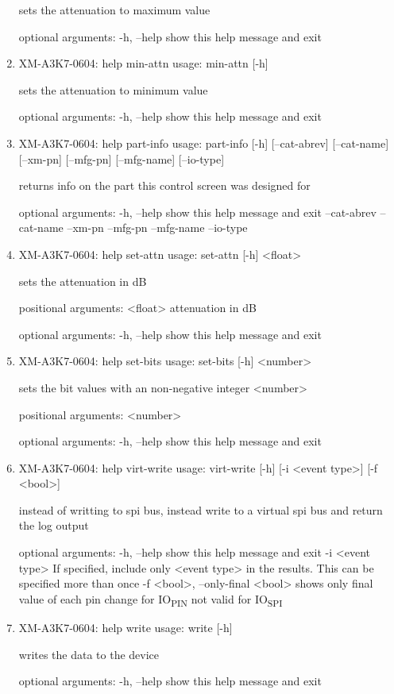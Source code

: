 \documentclass[11pt]{article}
\begin{document}
\begin{enumerate}
sets the attenuation to maximum value

optional arguments:
  -h, --help  show this help message and exit

\item XM-A3K7-0604: help min-attn
\label{sec:orgaaffeba}
usage: min-attn [-h]

sets the attenuation to minimum value

optional arguments:
  -h, --help  show this help message and exit

\item XM-A3K7-0604: help part-info
\label{sec:org6d5c5c6}
usage: part-info  [-h] [--cat-abrev] [--cat-name] [--xm-pn] [--mfg-pn] [--mfg-name]
        [--io-type]

returns info on the part this control screen was designed for

optional arguments:
  -h, --help   show this help message and exit
  --cat-abrev
  --cat-name
  --xm-pn
  --mfg-pn
  --mfg-name
  --io-type

\item XM-A3K7-0604: help set-attn
\label{sec:orgcdcab68}
usage: set-attn [-h] <float>

sets the attenuation in dB

positional arguments:
  <float>     attenuation in dB

optional arguments:
  -h, --help  show this help message and exit

\item XM-A3K7-0604: help set-bits
\label{sec:orgcce2741}
usage: set-bits [-h] <number>

sets the bit values with an non-negative integer <number>

positional arguments:
  <number>

optional arguments:
  -h, --help  show this help message and exit

\item XM-A3K7-0604: help virt-write
\label{sec:org9bdf0b6}
usage: virt-write [-h] [-i <event type>] [-f <bool>]

instead of writting to spi bus, instead write to a virtual spi bus and return
the log output

optional arguments:
  -h, --help            show this help message and exit
  -i <event type>       If specified, include only <event type> in the
                        results. This can be specified more than once
  -f <bool>, --only-final <bool>
                        shows only final value of each pin change for IO\textsubscript{PIN}
                        not valid for IO\textsubscript{SPI}

\item XM-A3K7-0604: help write
\label{sec:org6dfee09}
usage: write [-h]

writes the data to the device

optional arguments:
  -h, --help  show this help message and exit
\end{enumerate}
\end{document}
